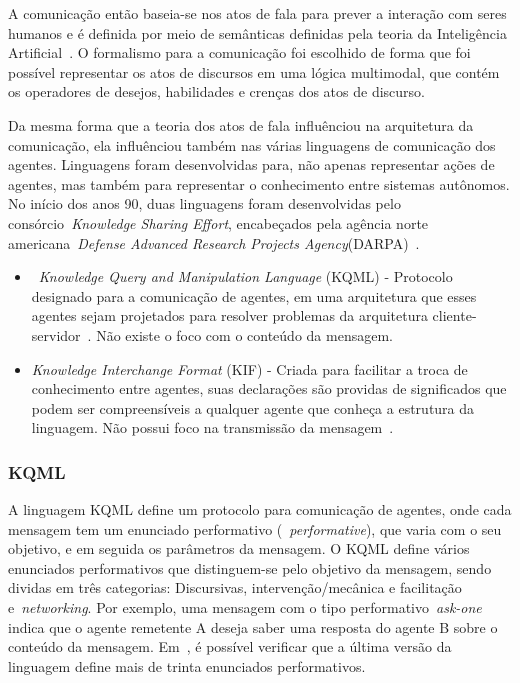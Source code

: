A comunicação então baseia-se nos atos de fala para prever a interação com seres humanos e é definida por meio de semânticas definidas pela teoria da Inteligência Artificial~\cite{wooldridge04}. O formalismo para a comunicação foi escolhido de forma que foi possível representar os atos de discursos em uma lógica multimodal, que contém os operadores de desejos, habilidades e crenças dos atos de discurso.

Da mesma forma que a teoria dos atos de fala influênciou na arquitetura da comunicação, ela influênciou também nas várias linguagens de comunicação dos agentes. Linguagens foram desenvolvidas para, não apenas representar ações de agentes, mas também para representar o conhecimento entre sistemas autônomos. No início dos anos 90, duas linguagens foram desenvolvidas pelo consórcio~\emph{Knowledge Sharing Effort}, encabeçados pela agência norte americana~\emph{Defense Advanced Research Projects Agency}(DARPA)~\cite{kse}.
\begin{itemize}
	\item ~\emph{Knowledge Query and Manipulation Language} (KQML) - Protocolo designado para a comunicação de agentes, em uma arquitetura que esses agentes sejam projetados para resolver problemas da arquitetura cliente-servidor~\cite{preece1997}. Não existe o foco com o conteúdo da mensagem.
	\item \emph{Knowledge Interchange Format} (KIF) - Criada para facilitar a troca de conhecimento entre agentes, suas declarações são providas de significados que podem ser compreensíveis a qualquer agente que conheça a estrutura da linguagem. Não possui foco na transmissão da mensagem~\cite{kifmanual}.
\end{itemize}

\subsubsection{KQML}

A linguagem KQML define um protocolo para comunicação de agentes, onde cada mensagem tem um enunciado performativo (~\emph{performative}), que varia com o seu objetivo, e em seguida os parâmetros da mensagem. O KQML define vários enunciados performativos que distinguem-se pelo objetivo da mensagem, sendo dividas em três categorias: Discursivas, intervenção/mecânica e facilitação e~\emph{networking}. Por exemplo, uma mensagem com o tipo performativo~\emph{ask-one} indica que o agente remetente A deseja saber uma resposta do agente B sobre o conteúdo da mensagem. Em~\cite{preece1997}, é possível verificar que a última versão da linguagem define mais de trinta enunciados performativos.

